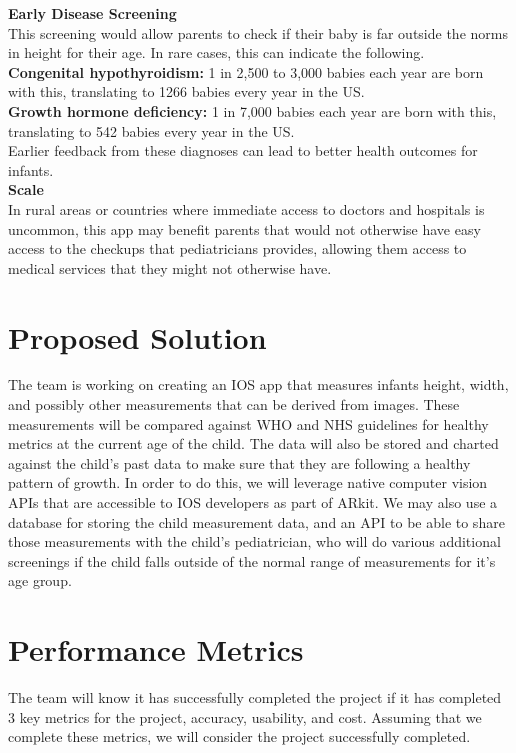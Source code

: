 \documentclass[10pt, draftclsnofoot, letterpaper, margin=.75in, onecolumn]{IEEEtran}
\begin{document}
\textbf{Early Disease Screening}\\
This screening would allow parents to check if their baby is far outside the norms in height for their age. In rare cases, this can indicate the following.\\
\textbf{Congenital hypothyroidism:} 1 in 2,500 to 3,000 babies each year are born with this, translating to 1266 babies every year in the US.\\
\textbf{Growth hormone deficiency:} 1 in 7,000 babies each year are born with this, translating to 542 babies every year in the US. \\
Earlier feedback from these diagnoses can lead to better health outcomes for infants.\\

\textbf{Scale}\\
In rural areas or countries where immediate access to doctors and hospitals is uncommon, this app may benefit parents that would not otherwise have easy access to the checkups that pediatricians provides, allowing them access to medical services that they might not otherwise have.

\section{Proposed Solution}
\par The team is working on creating an IOS app that measures infants height, width, and possibly other measurements that can be derived from images. These measurements will be compared against WHO and NHS guidelines for healthy metrics at the current age of the child. The data will also be stored and charted against the child’s past data to make sure that they are following a healthy pattern of growth. In order to do this, we will leverage native computer vision APIs that are accessible to IOS developers as part of ARkit. We may also use a database for storing the child measurement data, and an API to be able to share those measurements with the child’s pediatrician, who will do various additional screenings if the child falls outside of the normal range of measurements for it’s age group.\\


\section{Performance Metrics}
\par The team will know it has successfully completed the project if it has completed 3 key metrics for the project, accuracy, usability, and cost. Assuming that we complete these metrics, we will consider the project successfully completed. \\
\end{document}
